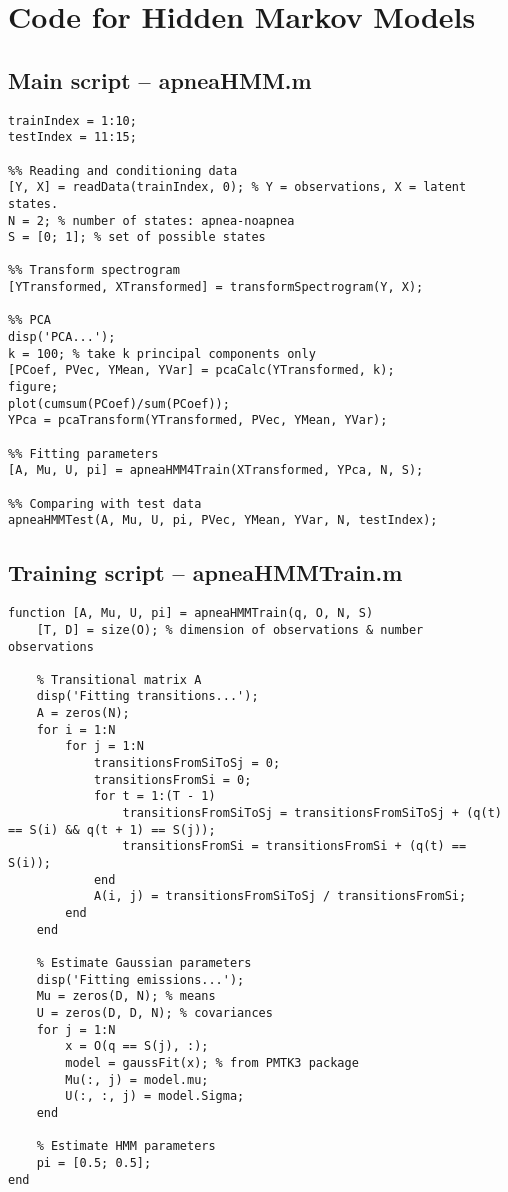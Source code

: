\chapter{Code for Hidden Markov Models}
\section{Main script -- apneaHMM.m}
\label{sec:apneaHMM}
\begin{lstlisting}
trainIndex = 1:10;
testIndex = 11:15;

%% Reading and conditioning data
[Y, X] = readData(trainIndex, 0); % Y = observations, X = latent states.
N = 2; % number of states: apnea-noapnea
S = [0; 1]; % set of possible states

%% Transform spectrogram
[YTransformed, XTransformed] = transformSpectrogram(Y, X);

%% PCA
disp('PCA...');
k = 100; % take k principal components only
[PCoef, PVec, YMean, YVar] = pcaCalc(YTransformed, k);
figure;
plot(cumsum(PCoef)/sum(PCoef));
YPca = pcaTransform(YTransformed, PVec, YMean, YVar);

%% Fitting parameters
[A, Mu, U, pi] = apneaHMM4Train(XTransformed, YPca, N, S);

%% Comparing with test data
apneaHMMTest(A, Mu, U, pi, PVec, YMean, YVar, N, testIndex);
\end{lstlisting}

\section{Training script -- apneaHMMTrain.m}
\label{sec:apneaHMMTrain}
\begin{lstlisting}
function [A, Mu, U, pi] = apneaHMMTrain(q, O, N, S)
    [T, D] = size(O); % dimension of observations & number observations

    % Transitional matrix A
    disp('Fitting transitions...');
    A = zeros(N);
    for i = 1:N
        for j = 1:N
            transitionsFromSiToSj = 0;
            transitionsFromSi = 0;
            for t = 1:(T - 1)
                transitionsFromSiToSj = transitionsFromSiToSj + (q(t) == S(i) && q(t + 1) == S(j));
                transitionsFromSi = transitionsFromSi + (q(t) == S(i));
            end
            A(i, j) = transitionsFromSiToSj / transitionsFromSi;
        end
    end

    % Estimate Gaussian parameters
    disp('Fitting emissions...');
    Mu = zeros(D, N); % means
    U = zeros(D, D, N); % covariances
    for j = 1:N
        x = O(q == S(j), :);
        model = gaussFit(x); % from PMTK3 package
        Mu(:, j) = model.mu;
        U(:, :, j) = model.Sigma;
    end

    % Estimate HMM parameters
    pi = [0.5; 0.5];
end
\end{lstlisting}

